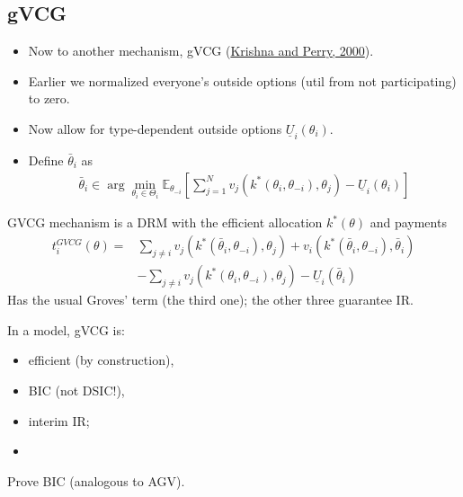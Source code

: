 \documentclass[english]{beamer}		%
\def\lyxframeend{} %
\begin{document}
\subsection{gVCG}

\begin{itemize}
	\item Now to another mechanism, gVCG (\href{https://sites.google.com/site/vjkrishna/research}{Krishna and Perry, 2000}).
	\item Earlier we normalized everyone's outside options (util from not participating) to zero.
	\item Now allow for type-dependent outside options $\underline{U}_i (\theta_i)$.
	\pause\medskip
	\item Define  $\bar{\theta}_i$ as
	\begin{align*}
	\bar{\theta}_i \in \arg \min_{\theta_i \in \Theta_i} \mathbb{E}_{\theta_{-i}} \left[ \sum_{j=1}^{N} v_j (k^*(\theta_i,\theta_{-i}),\theta_j) - \underline{U}_i (\theta_i) \right]
	\end{align*}
\end{itemize}
\lyxframeend


GVCG mechanism is a DRM with the efficient allocation $k^*(\theta)$ and payments
\begin{align*}
t_i^{GVCG} (\theta) =& \sum_{j \neq i} v_j (k^*(\bar{\theta}_i,\theta_{-i}),\theta_j) + v_i (k^*(\bar{\theta}_i,\theta_{-i}),\bar{\theta}_i)
\\& - \sum_{j \neq i} v_j (k^*(\theta_i,\theta_{-i}),\theta_j) - \underline{U}_i (\bar{\theta}_i)
\end{align*}
\pause
Has the usual Groves' term (the third one); the other three guarantee IR.
\lyxframeend


\begin{theorem}
	In a  model, gVCG is:
	\begin{itemize}
		\item efficient (by construction),
		\item BIC (not DSIC!),
		\item interim IR;
		\item {}
	\end{itemize}
\end{theorem}
Prove BIC (analogous to AGV).
\lyxframeend
\end{document}
